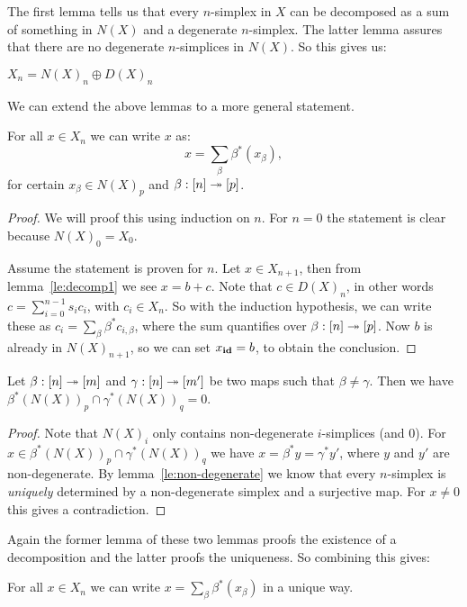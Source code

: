 The first lemma tells us that every $n$-simplex in $X$ can be decomposed as a sum of something in $N(X)$ and a degenerate $n$-simplex. The latter lemma assures that there are no degenerate $n$-simplices in $N(X)$. So this gives us:

\begin{corollary}
	\label{cor:NandD}
	$X_n = N(X)_n \oplus D(X)_n$
\end{corollary}

We can extend the above lemmas to a more general statement.

\begin{lemma}
	\label{le:decomp3}
	For all $x \in X_n$ we can write $x$ as:
	$$ x = \sum_\beta \beta^\ast (x_\beta), $$
	for certain $x_\beta \in N(X)_p$ and $\beta : [n] \twoheadrightarrow [p]$.
\end{lemma}
\begin{proof}
	We will proof this using induction on $n$. For $n=0$ the statement is clear because $N(X)_0 = X_0$.

	Assume the statement is proven for $n$. Let $x \in X_{n+1}$, then from lemma~\ref{le:decomp1} we see $x = b + c$. Note that $c \in D(X)_n$, in other words $c = \sum_{i=0}^{n-1} s_i c_i$, with $c_i \in X_n$. So with the induction hypothesis, we can write these as $c_i = \sum_\beta \beta^\ast c_{i, \beta}$, where the sum quantifies over $\beta: [n] \twoheadrightarrow [p]$. Now $b$ is already in $N(X)_{n+1}$, so we can set $x_{\mathbf{id}} = b$, to obtain the conclusion.
\end{proof}
\begin{lemma}
	\label{le:decomp4}
	Let $\beta : [n] \twoheadrightarrow [m]$ and $\gamma : [n] \twoheadrightarrow [m']$ be two maps such that $\beta \neq \gamma$. Then we have $\beta^\ast(N(X))_p \cap \gamma^\ast(N(X))_q = 0$.
\end{lemma}
\begin{proof}
	Note that $N(X)_i$ only contains non-degenerate $i$-simplices (and $0$). For $x \in \beta^\ast(N(X))_p \cap \gamma^\ast(N(X))_q$ we have $x = \beta^\ast y = \gamma^\ast y'$, where $y$ and $y'$ are non-degenerate. By lemma~\ref{le:non-degenerate} we know that every $n$-simplex is \emph{uniquely} determined by a non-degenerate simplex and a surjective map. For $x \neq 0$ this gives a contradiction.
\end{proof}

Again the former lemma of these two lemmas proofs the existence of a decomposition and the latter proofs the uniqueness. So combining this gives:

\begin{corollary}
	\label{cor:decomp}
	For all $x \in X_n$ we can write $x = \sum_\beta \beta^\ast (x_\beta)$ in a unique way.
\end{corollary}

